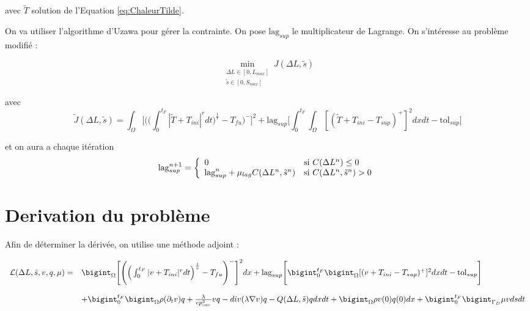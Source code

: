 \documentclass[11pt,a4paper]{article}
\begin{document}
avec $\tilde T$ solution de l'Equation \ref{eq:ChaleurTilde}.

\vspace{0cm}

On va utiliser l'algorithme d'Uzawa pour gérer la contrainte. On pose $\textrm{lag}_{sup}$ le multiplicateur de Lagrange. On s'intéresse au problème modifié :

\begin{equation}
\min_{\begin{array}{l}
	\Delta L\in[0,L_{max}] \\
	\tilde{s}\in [0,S_{max}]
	\end{array}} J(\Delta L,\tilde{s})
\end{equation}

avec 
\begin{equation}
\tilde{J}(\Delta L,\tilde{s})=\int_{\Omega}\Bigg[\Bigg(\Big(\int_{0}^{t_F}|\tilde{T}+T_{ini}|^rdt\Big)^{\frac{1}{r}}-T_{fu}\Bigg)^-\Bigg]^2+\textrm{lag}_{sup} \Bigg[\int_{0}^{t_F}\int_{\Omega}[(\tilde{T}+T_{ini}-T_{sup})^+]^2dxdt-\textrm{tol}_{sup}\Bigg]
\end{equation}

et on aura a chaque itération 
\begin{equation}
\textrm{lag}_{sup}^{n+1}=\left\{
\begin{array}{ll}
0 & \textrm{si\,\,}C(\Delta L^n)\leq0 \\
\textrm{lag}_{sup}^n+\mu_{lag}C(\Delta L^n,\tilde{s}^n) & \textrm{si\,\,}C(\Delta L^n,\tilde{s}^n)>0
\end{array}
\right.
\end{equation}





\section*{Derivation du problème}

Afin de déterminer la dérivée, on utilise une méthode adjoint :

\begin{equation}
\begin{array}{ll}
\mathcal{L}(\Delta L,\tilde{s},v,q,\mu)= & \bigint_{\Omega}\Bigg[\Bigg(\Big(\int_{0}^{t_F}|v+T_{ini}|^rdt\Big)^{\frac{1}{r}}-T_{fu}\Bigg)^-\Bigg]^2dx +\textrm{lag}_{sup} \Bigg[\bigint_{0}^{t_F}\bigint_{\Omega}[(v+T_{ini}-T_{sup})^+]^2dxdt-\textrm{tol}_{sup}\Bigg] \\
\\
\, & + \bigint_{0}^{t_F}\bigint_{\Omega}\rho(\partial_t v)q+\frac{\lambda}{ep_{car}^2} vq-div(\lambda\nabla v)q-Q(\Delta L,\tilde{s})q dxdt +\bigint_{\Omega}\rho v(0)q(0) dx+\bigint_{0}^{t_F}\bigint_{\Gamma_D}\mu v dsdt\\
\end{array}
\end{equation}
\end{document}
